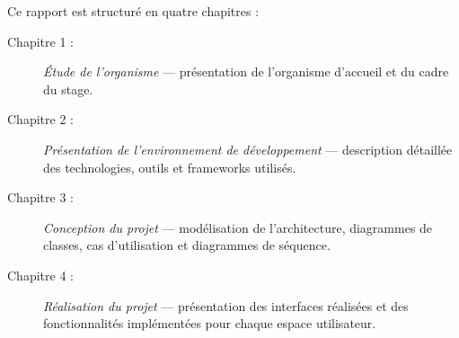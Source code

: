 \vspace{0.5cm}

Ce rapport est structuré en quatre chapitres :

\begin{description}
    \item[Chapitre 1 :] \textit{Étude de l'organisme} — présentation de l'organisme d'accueil et du cadre du stage.
    \item[Chapitre 2 :] \textit{Présentation de l'environnement de développement} — description détaillée des technologies, outils et frameworks utilisés.
    \item[Chapitre 3 :] \textit{Conception du projet} — modélisation de l'architecture, diagrammes de classes, cas d'utilisation et diagrammes de séquence.
    \item[Chapitre 4 :] \textit{Réalisation du projet} — présentation des interfaces réalisées et des fonctionnalités implémentées pour chaque espace utilisateur.
\end{description}

\newpage

